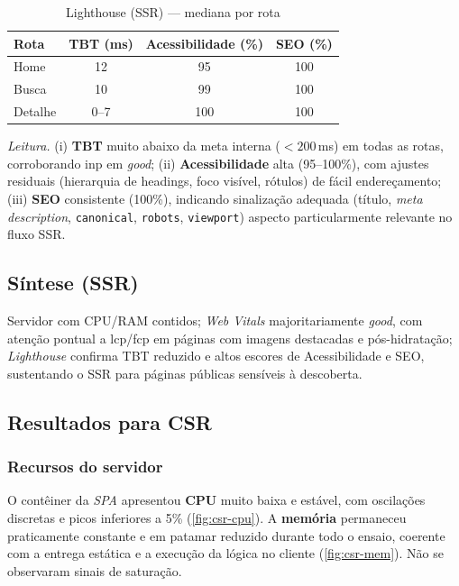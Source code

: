 \begin{table}[H]
\centering
\caption{Lighthouse (SSR) — mediana por rota}
\label{tab:lh-ssr}
\begin{tabular}{|l|c|c|c|}
\hline
\textbf{Rota} & \textbf{TBT (ms)} & \textbf{Acessibilidade (\%)} & \textbf{SEO (\%)} \\
\hline
Home    & 12 & 95  & 100 \\
Busca   & 10 & 99  & 100 \\
Detalhe & 0--7\footnotemark[1] & 100 & 100 \\
\hline
\end{tabular}
\end{table}

\noindent \textit{Leitura.}
(i) \textbf{TBT} muito abaixo da meta interna ($<200$\,ms) em todas as rotas, corroborando \acrshort{inp} em \textit{good};
(ii) \textbf{Acessibilidade} alta (95--100\%), com ajustes residuais (hierarquia de headings, foco visível, rótulos) de fácil endereçamento;
(iii) \textbf{SEO} consistente (100\%), indicando sinalização adequada (título, \emph{meta description}, \texttt{canonical}, \texttt{robots}, \texttt{viewport}) aspecto particularmente relevante no fluxo SSR.

\subsection{Síntese (SSR)}
Servidor com CPU/RAM contidos; \emph{Web Vitals} majoritariamente \textit{good}, com atenção pontual a \acrshort{lcp}/\acrshort{fcp} em páginas com imagens destacadas e pós-hidratação; \emph{Lighthouse} confirma TBT reduzido e altos escores de Acessibilidade e SEO, sustentando o SSR para páginas públicas sensíveis à descoberta.

\subsection{Resultados para CSR}
\label{subsec:resultados-csr}

\subsubsection{Recursos do servidor}
O contêiner da \emph{SPA} apresentou \textbf{CPU} muito baixa e estável, com oscilações discretas e picos inferiores a 5\% (\autoref{fig:csr-cpu}). A \textbf{memória} permaneceu praticamente constante e em patamar reduzido durante todo o ensaio, coerente com a entrega estática e a execução da lógica no cliente (\autoref{fig:csr-mem}). Não se observaram sinais de saturação.

